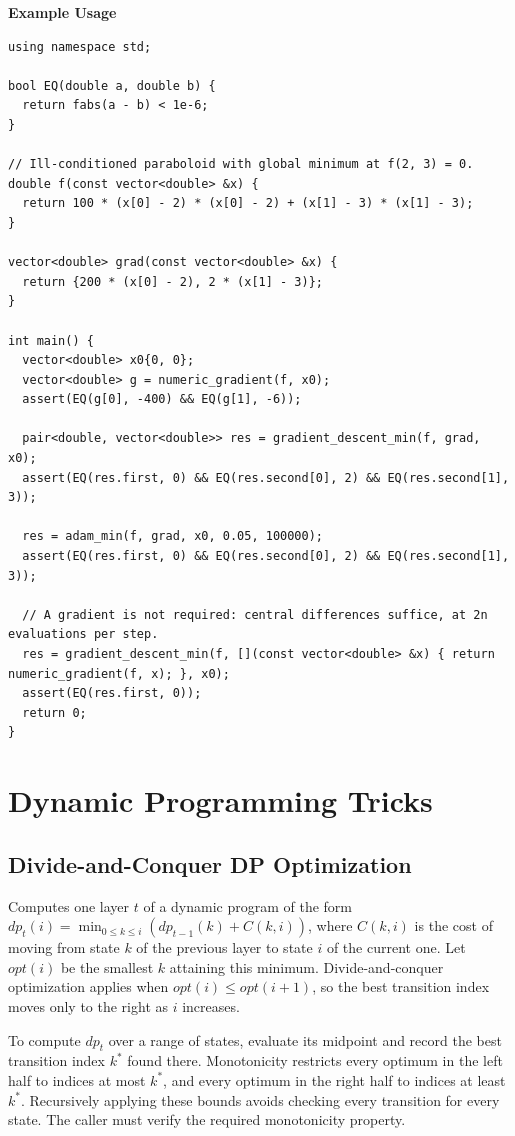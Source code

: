 \textbf{Example Usage}\par
\begin{lstlisting}[style=cpp]
using namespace std;

bool EQ(double a, double b) {
  return fabs(a - b) < 1e-6;
}

// Ill-conditioned paraboloid with global minimum at f(2, 3) = 0.
double f(const vector<double> &x) {
  return 100 * (x[0] - 2) * (x[0] - 2) + (x[1] - 3) * (x[1] - 3);
}

vector<double> grad(const vector<double> &x) {
  return {200 * (x[0] - 2), 2 * (x[1] - 3)};
}

int main() {
  vector<double> x0{0, 0};
  vector<double> g = numeric_gradient(f, x0);
  assert(EQ(g[0], -400) && EQ(g[1], -6));

  pair<double, vector<double>> res = gradient_descent_min(f, grad, x0);
  assert(EQ(res.first, 0) && EQ(res.second[0], 2) && EQ(res.second[1], 3));

  res = adam_min(f, grad, x0, 0.05, 100000);
  assert(EQ(res.first, 0) && EQ(res.second[0], 2) && EQ(res.second[1], 3));

  // A gradient is not required: central differences suffice, at 2n evaluations per step.
  res = gradient_descent_min(f, [](const vector<double> &x) { return numeric_gradient(f, x); }, x0);
  assert(EQ(res.first, 0));
  return 0;
}
\end{lstlisting}

\section{\texorpdfstring{Dynamic Programming Tricks}{5.3 Dynamic Programming Tricks}}
\setcounter{section}{3}
\setcounter{subsection}{0}
\subsection{Divide-and-Conquer DP Optimization}
\label{sec:5.3.1}
Computes one layer $t$ of a dynamic program of the form $dp_t(i) = \min_{0 \leq k \leq i} (dp_{t-1}(k) + C(k, i))$, where $C(k, i)$ is the cost of moving from state $k$ of the previous layer to state $i$ of the current one. Let $opt(i)$ be the smallest $k$ attaining this minimum. Divide-and-conquer optimization applies when $opt(i) \leq opt(i + 1)$, so the best transition index moves only to the right as $i$ increases.

To compute $dp_t$ over a range of states, evaluate its midpoint and record the best transition index $k^*$ found there. Monotonicity restricts every optimum in the left half to indices at most $k^*$, and every optimum in the right half to indices at least $k^*$. Recursively applying these bounds avoids checking every transition for every state. The caller must verify the required monotonicity property.

